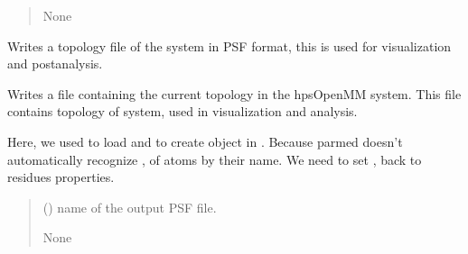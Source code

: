 \documentclass[letterpaper,10pt,english]{sphinxmanual}
\begin{document}
\begin{fulllineitems}
\begin{fulllineitems}
\begin{quote}
\begin{description}
\sphinxAtStartPar
None

\end{description}\end{quote}

\end{fulllineitems}


\begin{fulllineitems}
\label{\detokenize{modules/system:hps.core.system.dumpTopology}}
\pysigstartsignatures
{}
\pysigstopsignatures
\sphinxAtStartPar
Writes a topology file of the system in PSF format, this is used for visualization and post\sphinxhyphen{}analysis.

\sphinxAtStartPar
Writes a file containing the current topology in the
hpsOpenMM system. This file contains topology of system, used in visualization and analysis.

\sphinxAtStartPar
Here, we used  to load  and  to create
 object in .
Because parmed doesn’t automatically recognize ,  of atoms by their name.
We need to set ,  back to residues properties.
\begin{quote}\begin{description}
\sphinxAtStartPar
{} (\sphinxstyleliteralemphasis{\sphinxupquote{ {[}}}\sphinxstyleliteralemphasis{\sphinxupquote{{]}}}) \textendash{} name of the output PSF file.

\sphinxAtStartPar
None

\end{description}\end{quote}

\end{fulllineitems}



\end{fulllineitems}
\end{document}
